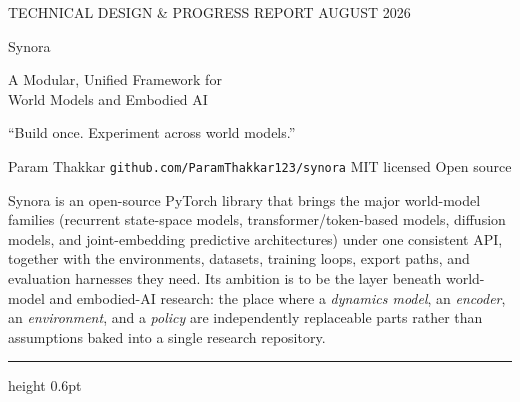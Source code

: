 \documentclass[10pt,a4paper]{article}
\newcommand{\sectionhead}[1]{\vspace{1mm}{\large\displayfont\color{ink} #1}\par\vspace{2mm}}
\begin{document}
\thispagestyle{fancy}


\vspace*{5mm}
{\color{white}
  {\footnotesize\displayfont\color{accent!35!white}TECHNICAL DESIGN \& PROGRESS REPORT \quad\textbullet\quad AUGUST 2026}\par
  \vspace{6mm}
  {\fontsize{40}{44}\selectfont\displayfont Synora}\par
  \vspace{3mm}
  {\fontsize{14.5}{18}\selectfont\lightfont\color{white}A Modular, Unified Framework for\\World Models and Embodied AI}\par
  \vspace{7mm}
  {\large\displayfont\color{accent!35!white}“Build once. Experiment across world models.”}\par
  \vspace{6mm}
  {\footnotesize\color{white!62!ink}Param Thakkar \quad\textbullet\quad \texttt{github.com/ParamThakkar123/synora} \quad\textbullet\quad MIT licensed \quad\textbullet\quad Open source}
}
\vspace{12mm}

\sectionhead{What Synora is}
Synora is an open-source PyTorch library that brings the major world-model families (recurrent
state-space models, transformer/token-based models, diffusion models, and joint-embedding predictive
architectures) under one consistent API, together with the environments, datasets, training loops,
export paths, and evaluation harnesses they need. Its ambition is to be the layer beneath
world-model and embodied-AI research: the place where a \emph{dynamics model}, an \emph{encoder},
an \emph{environment}, and a \emph{policy} are independently replaceable parts rather than
assumptions baked into a single research repository.

\vspace{3mm}
{\color{rule}\hrule height 0.6pt}
\vspace{3.5mm}
\end{document}

